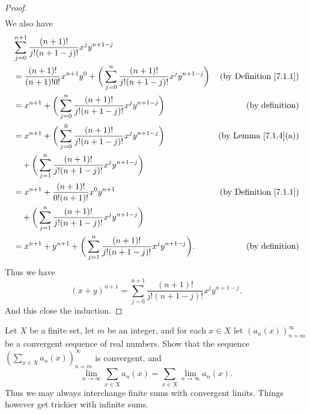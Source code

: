 \begin{proof}
\begin{align*}
    \end{align*}
    We also have
    \begin{align*}
         & \sum_{j = 0}^{n + 1} \frac{(n + 1)!}{j!(n + 1 - j)!} x^j y^{n + 1 - j}                                                                                           \\
         & = \frac{(n + 1)!}{(n + 1)! 0!} x^{n + 1} y^0 + \bigg(\sum_{j = 0}^n \frac{(n + 1)!}{j!(n + 1 - j)!} x^j y^{n + 1 - j}\bigg) & \text{(by Definition \ref{7.1.1})} \\
         & = x^{n + 1} + \bigg(\sum_{j = 0}^n \frac{(n + 1)!}{j!(n + 1 - j)!} x^j y^{n + 1 - j}\bigg)                                  & \text{(by definition)}             \\
         & = x^{n + 1} + \bigg(\sum_{j = 0}^0 \frac{(n + 1)!}{j!(n + 1 - j)!} x^j y^{n + 1 - j}\bigg)                                  & \text{(by Lemma \ref{7.1.4}(a))}   \\
         & \quad + \bigg(\sum_{j = 1}^n \frac{(n + 1)!}{j!(n + 1 - j)!} x^j y^{n + 1 - j}\bigg)                                                                             \\
         & = x^{n + 1} + \frac{(n + 1)!}{0! (n + 1)!} x^0 y^{n + 1}                                                                    & \text{(by Definition \ref{7.1.1})} \\
         & \quad + \bigg(\sum_{j = 1}^n \frac{(n + 1)!}{j!(n + 1 - j)!} x^j y^{n + 1 - j}\bigg)                                                                             \\
         & = x^{n + 1} + y^{n + 1} + \bigg(\sum_{j = 1}^n \frac{(n + 1)!}{j!(n + 1 - j)!} x^j y^{n + 1 - j}\bigg).                     & \text{(by definition)}
    \end{align*}
    Thus we have
    \[
        (x + y)^{n + 1} = \sum_{j = 0}^{n + 1} \frac{(n + 1)!}{j!(n + 1 - j)!} x^j y^{n + 1 - j}.
    \]
    And this close the induction.
\end{proof}

\begin{exercise}\label{ex 7.1.5}
    Let \(X\) be a finite set, let \(m\) be an integer, and for each \(x \in X\) let \((a_n(x))_{n = m}^\infty\) be a convergent sequence of real numbers.
    Show that the sequence \((\sum_{x \in X} a_n(x))_{n = m}^\infty\) is convergent, and
    \[
        \lim_{n \to \infty} \sum_{x \in X} a_n(x) = \sum_{x \in X} \lim_{n \to \infty} a_n(x).
    \]
    Thus we may always interchange finite sums with convergent limits.
    Things however get trickier with infinite sums.
\end{exercise}


